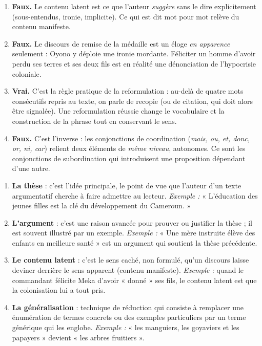 \documentclass[11pt]{article}
\newcommand{\cle}[1]{{\popxbold\color{popdark}#1}}
\begin{document}
\begin{corrige}
\begin{enumerate}
\item \textbf{Faux.} Le contenu latent est ce que l'auteur \emph{suggère} sans le dire explicitement (sous-entendus, ironie, implicite). Ce qui est dit mot pour mot relève du \cle{contenu manifeste}.
\item \textbf{Faux.} Le discours de remise de la médaille est un éloge \emph{en apparence} seulement : Oyono y déploie une ironie mordante. Féliciter un homme d'avoir perdu ses terres et ses deux fils est en réalité une dénonciation de l'hypocrisie coloniale.
\item \textbf{Vrai.} C'est la règle pratique de la reformulation : au-delà de quatre mots consécutifs repris au texte, on parle de recopie (ou de citation, qui doit alors être signalée). Une reformulation réussie change le vocabulaire et la construction de la phrase tout en conservant le sens.
\item \textbf{Faux.} C'est l'inverse : les conjonctions de coordination (\emph{mais, ou, et, donc, or, ni, car}) relient deux éléments de \emph{même niveau}, autonomes. Ce sont les conjonctions de subordination qui introduisent une proposition dépendant d'une autre.
\end{enumerate}
\end{corrige}

\begin{corrige}
\begin{enumerate}
\item \textbf{La thèse} : c'est l'idée principale, le point de vue que l'auteur d'un texte argumentatif cherche à faire admettre au lecteur. \emph{Exemple :} « L'éducation des jeunes filles est la clé du développement du Cameroun. »
\item \textbf{L'argument} : c'est une raison avancée pour prouver ou justifier la thèse ; il est souvent illustré par un exemple. \emph{Exemple :} « Une mère instruite élève des enfants en meilleure santé » est un argument qui soutient la thèse précédente.
\item \textbf{Le contenu latent} : c'est le sens caché, non formulé, qu'un discours laisse deviner derrière le sens apparent (contenu manifeste). \emph{Exemple :} quand le commandant félicite Meka d'avoir « donné » ses fils, le contenu latent est que la colonisation lui a tout pris.
\item \textbf{La généralisation} : technique de réduction qui consiste à remplacer une énumération de termes concrets ou des exemples particuliers par un terme générique qui les englobe. \emph{Exemple :} « les manguiers, les goyaviers et les papayers » devient « les arbres fruitiers ».
\end{enumerate}
\end{corrige}
\end{document}
